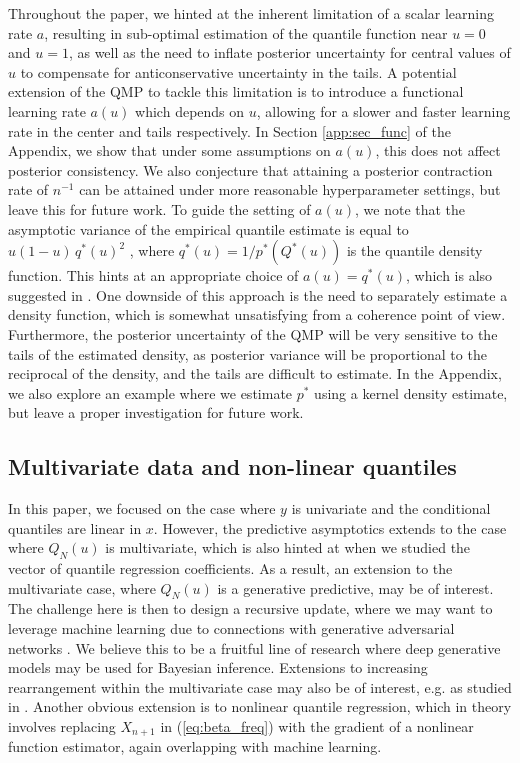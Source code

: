 \documentclass[11pt,a4paper]{article}
\begin{document}
Throughout the paper, we hinted at the inherent limitation of a scalar learning rate $a$, resulting in sub-optimal estimation of the quantile function near $u = 0$ and $u = 1$, as well as the need to inflate posterior uncertainty for central values of $u$ to compensate for anticonservative uncertainty in the tails. A potential extension of the QMP to tackle this limitation is to introduce a functional learning rate $a(u)$ which depends on $u$, allowing for a slower and faster learning rate in the center and tails respectively. In Section \ref{app:sec_func} of the Appendix, we show that under some assumptions on $a(u)$, this does not affect posterior consistency. We also conjecture that attaining a posterior contraction rate of $n^{-1}$ can be attained under more reasonable hyperparameter settings, but leave this for future work. To guide the setting of $a(u)$, we note that the asymptotic variance of the empirical quantile estimate is equal to $u(1-u)\,  q^*(u)^2$ \citep{vanderVaart2000}, where $q^*(u) = 1/p^*\left(Q^*(u)\right)$ is the quantile density function. This hints at an appropriate choice of $a(u) = q^*(u)$, which is also suggested in \cite{Aboubacar2014}. One downside of this approach is the need to separately estimate a density function, which is somewhat unsatisfying from a coherence point of view. Furthermore, the posterior uncertainty of the QMP will be very sensitive to the tails of the estimated density, as posterior variance will be proportional to the reciprocal of the density, and the tails are difficult to estimate. In the Appendix, we also explore an example where we estimate $p^*$ using a kernel density estimate, but leave a proper investigation for future work.

\subsection{Multivariate data and non-linear quantiles}\label{sec:nonlinear}
In this paper, we focused on the case where $y$ is univariate and the conditional quantiles are linear in $x$. However, the predictive asymptotics extends to the case where $Q_N(u)$ is multivariate, which is also hinted at when we studied the vector of quantile regression coefficients. As a result, an extension to the multivariate case, where $Q_N(u)$ is a generative predictive, may be of interest. The challenge here is then to design a recursive update, where we may want to leverage machine learning due to connections with generative adversarial networks \citep{Goodfellow2020}. We believe this to be a fruitful line of research where deep generative models may be used for Bayesian inference.
Extensions to increasing rearrangement within the multivariate case may also be of interest, e.g. as studied in \cite{Carlier2016,Rosenberg2022}. Another obvious extension is to nonlinear quantile regression, which in theory involves replacing $X_{n+1}$ in (\ref{eq:beta_freq}) with the gradient of a nonlinear function estimator, again overlapping with machine learning. 
\end{document}

